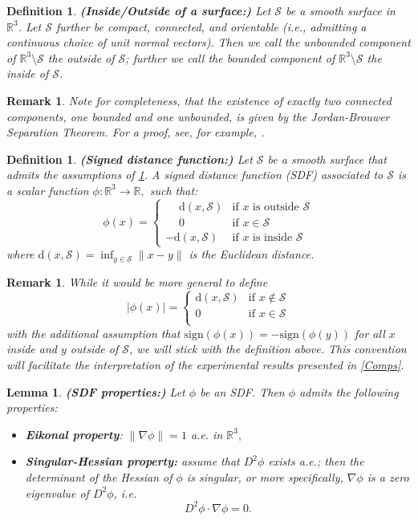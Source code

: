 \documentclass[12pt,openany]{book}
\newcommand{\R}{\mathbb{R}}
\def\S{\mathcal{S}}
\theoremstyle{plainnormal}
\newtheorem{lemma}[theorem]{Lemma}
\newtheorem{definition}[theorem]{Definition}
\newtheorem{remark}[theorem]{Remark}
\theoremstyle{remark}
\begin{document}
\begin{definition}\label{defInsOuts}\textbf{(Inside/Outside of a surface:)}
    Let $\S$ be a smooth surface in $\R^3$. Let $\S$ further be compact, connected, and orientable (i.e., admitting a continuous choice of unit normal vectors). Then we call the unbounded component of $\R^3\setminus \S$ the \emph{outside} of $\S$; further we call the bounded component of $\R^3\setminus \S$ the \emph{inside} of $\S$.
\end{definition}
\begin{remark}
    Note for completeness, that the existence of exactly two connected components, one bounded and one unbounded, is given by the \emph{Jordan-Brouwer Separation Theorem}. For a proof, see, for example, \cite{Lima01011988}. 
\end{remark}
\begin{definition}\textbf{(Signed distance function:)}
    Let $\S$ be a smooth surface that admits the assumptions of \cref{defInsOuts}. A \emph{signed distance function} (SDF) associated to $\S$ is a scalar function 
    $\phi: \R^3 \rightarrow \R,$
    such that:
    $$\phi(x) = 
\begin{cases}
\phantom{-}\mathrm{d}(x, \S) & \text{if } x \text{ is outside } \S \\
\phantom{-} 0 & \text{if } x \in \S \\
-\mathrm{d}(x, \S) & \text{if } x \text{ is inside } \S
\end{cases} $$
    where $\mathrm{d} (x, \S)= \inf_{y\in \S} \|x - y\|$ is the Euclidean distance.
\end{definition}
    \begin{remark}
        While it would be more general to define
    $$|\phi(x)| = 
\begin{cases}
\mathrm{d}(x, \S) & \text{if } x \notin \S \\
0 & \text{if } x \in \S \\
\end{cases}$$
with the additional assumption that 
$\mathrm{sign}(\phi(x)) = - \mathrm{sign}(\phi (y))$ for all $x$ inside and $y$ outside of $\S$, we will stick with the definition above. This convention will facilitate the interpretation of the experimental results presented in \cref{Comps}.
    \end{remark}
\begin{lemma}\label{singHess} \textbf{(SDF properties:)}
    Let $\phi$ be an SDF. Then $\phi$ admits the following properties:
    \begin{itemize}
        \item \textbf{Eikonal property}:  $\|\nabla \phi\| = 1 $ a.e. in $\R^3,$ 
        \item \textbf{Singular-Hessian property:} assume that $D^2\phi$ exists a.e.; then the determinant of the Hessian of $\phi$ is singular, or more specifically, $\nabla \phi$ is a zero eigenvalue of $D^2 \phi$, i.e.
        $$D^2 \phi \cdot\nabla \phi = 0.$$
    
    \end{itemize}
\end{lemma}
\end{document}
